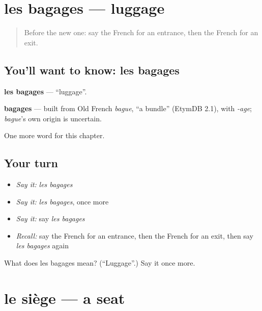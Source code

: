 \section[les bagages]{les bagages — luggage}

\label{lesson:FR-C199-bagages}



\begin{quote}
Before the new one: say the French for an entrance, then the French for an exit.
\end{quote}

\subsection*{You'll want to know: les bagages}
\textbf{les bagages} — \textquotedblleft{}luggage\textquotedblright{}.

\begin{cousinweb}
\textbf{bagages} — built from Old French \emph{bague}, \textquotedblleft{}a bundle\textquotedblright{} (EtymDB 2.1), with \emph{-age}; \emph{bague}'s own origin is uncertain.
\end{cousinweb}

\begin{grammarlens}[title={What you've built}]
One more word for this chapter.
\end{grammarlens}

\subsection*{Your turn}
\begin{itemize}
\raggedright
  \item \emph{Say it:} \emph{les bagages}
  \item \emph{Say it:} \emph{les bagages}, once more
  \item \emph{Say it:} say \emph{les bagages}
  \item \emph{Recall:} say the French for an entrance, then the French for an exit, then say \emph{les bagages} again
\end{itemize}

\begin{tcolorbox}[breakable,colback=teal!4,colframe=teal!35!black,title={Before you move on}]
What does les bagages mean? (\textquotedblleft{}Luggage\textquotedblright{}.) Say it once more.
\end{tcolorbox}
\section[le siège]{le siège — a seat}

